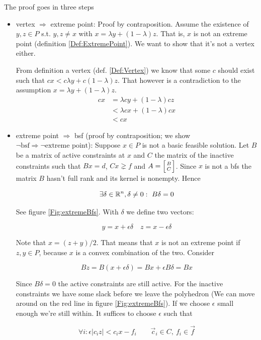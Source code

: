 \begin{pr} The proof goes in three steps
\begin{itemize}
\item vertex $\Rightarrow$ extreme point: Proof by contraposition. Assume the existence of $y,z \in P$ s.t. $y,z\neq x$ with $x= \lambda y + (1-\lambda )z$. That is, $x$ is not an extreme point (definition \ref{Def:ExtremePoint}). We want to show that it's not a vertex either.

From definition a vertex (def. \ref{Def:Vertex}) we know that some $c$ should exist such that $c x < c \lambda y  + c (1-\lambda) z$. That however is a contradiction to the assumption $x= \lambda y + (1-\lambda )z$.
\begin{align*}
cx &= \lambda cy +(1-\lambda)cz\\
   &< \lambda cx + (1-\lambda)cx\\
   &< cx
\end{align*}

\item extreme point $\Rightarrow$ bsf (proof by contraposition; we show $\neg \text{bsf} \Rightarrow \neg \text{extreme point}$): Suppose $x\in P$ is not a basic feasible solution. Let $B$ be a matrix of active constraints at $x$ and $C$ the matrix of the inactive constraints such that $Bx=d$, $Cx\gneq f$ and $A = \left[B\atop C\right]$. Since $x$ is not a bfs the matrix $B$ hasn't full rank and its kernel is nonempty. Hence

\[\exists \delta \in \R^n, \delta \neq 0:\ B\delta =0\]

See figure \ref{Fig:extremeBfs}. With $\delta$ we define two vectors:

\[y=x+\epsilon \delta \quad z = x-\epsilon \delta\]

Note that $x=(z+y)/2$. That means that $x$ is not an extreme point if $z,y \in P$, because $x$ is a convex combination of the two. Consider 

\[Bz = B(x+\epsilon \delta) = Bx + \epsilon B\delta = Bx\]

Since $B\delta = 0$ the active constraints are still active. For the inactive constraints we have some slack before we leave the polyhedron (We can move around on the red line in figure \ref{Fig:extremeBfs}). If we choose $\epsilon$ small enough we're still within. It suffices to choose $\epsilon$ such that 

\[\forall i: \epsilon |c_i z| < c_i x - f_i\qquad \vec c_i\in C,\ f_i \in \vec f\]


\end{itemize}
\end{pr}
